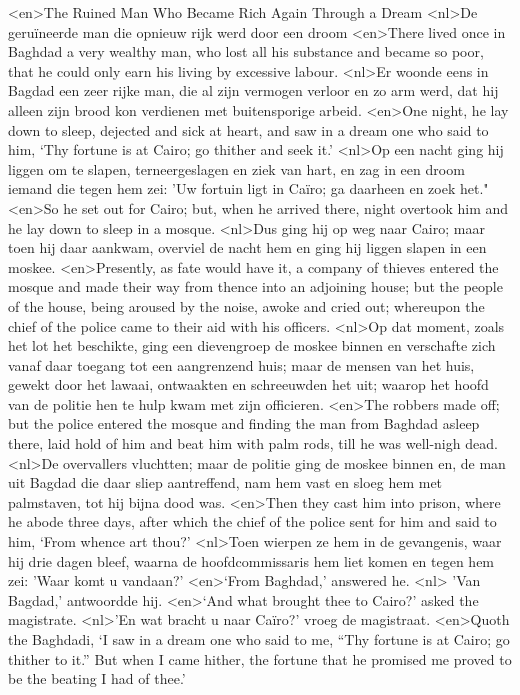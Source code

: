 <en>The Ruined Man Who Became Rich Again Through a Dream 
<nl>De geruïneerde man die opnieuw rijk werd door een droom
<en>There lived once in Baghdad a very wealthy man, who lost all his substance and became so poor, that he could only earn his living by excessive labour.
<nl>Er woonde eens in Bagdad een zeer rijke man, die al zijn vermogen verloor en zo arm werd, dat hij alleen zijn brood kon verdienen met buitensporige arbeid.
<en>One night, he lay down to sleep, dejected and sick at heart, and saw in a dream one who said to him, ‘Thy fortune is at Cairo; go thither and seek it.’ 
<nl>Op een nacht ging hij liggen om te slapen, terneergeslagen en ziek van hart, en zag in een droom iemand die tegen hem zei: 'Uw fortuin ligt in Caïro; ga daarheen en zoek het." 
<en>So he set out for Cairo; but, when he arrived there, night overtook him and he lay down to sleep in a mosque.
<nl>Dus ging hij op weg naar Cairo; maar toen hij daar aankwam, overviel de nacht hem en ging hij liggen slapen in een moskee.
<en>Presently, as fate would have it, a company of thieves entered the mosque and made their way from thence into an adjoining house; but the people of the house, being aroused by the noise, awoke and cried out; whereupon the chief of the police came to their aid with his officers.
<nl>Op dat moment, zoals het lot het beschikte, ging een dievengroep de moskee binnen en verschafte zich vanaf daar toegang tot een aangrenzend huis; maar de mensen van het huis, gewekt door het lawaai, ontwaakten en schreeuwden het uit; waarop het hoofd van de politie hen te hulp kwam met zijn officieren.
<en>The robbers made off; but the police entered the mosque and finding the man from Baghdad asleep there, laid hold of him and beat him with palm rods, till he was well-nigh dead.
<nl>De overvallers vluchtten; maar de politie ging de moskee binnen en,  de man uit Bagdad die daar sliep aantreffend, nam hem vast en sloeg hem met palmstaven, tot hij bijna dood was.
<en>Then they cast him into prison, where he abode three days, after which the chief of the police sent for him and said to him, ‘From whence art thou?’ 
<nl>Toen wierpen ze hem in de gevangenis, waar hij drie dagen bleef, waarna de hoofdcommissaris hem liet komen en tegen hem zei: 'Waar komt u vandaan?'
<en>‘From Baghdad,’ answered he.
<nl> 'Van Bagdad,' antwoordde hij.
<en>‘And what brought thee to Cairo?’ asked the magistrate.
<nl>'En wat bracht u naar Caïro?' vroeg de magistraat.
<en>Quoth the Baghdadi, ‘I saw in a dream one who said to me, “Thy fortune is at Cairo; go thither to it.” But when I came hither, the fortune that he promised me proved to be the beating I had of thee.’

